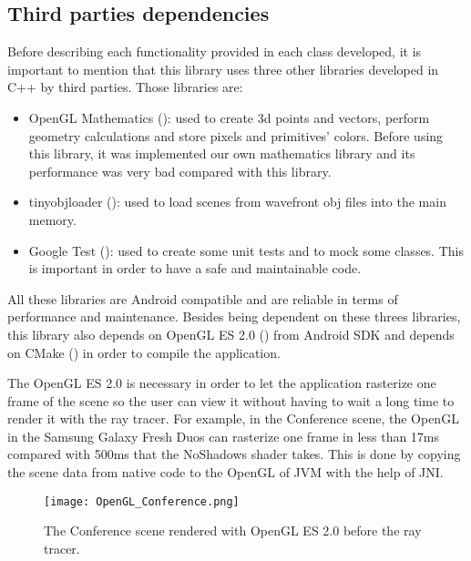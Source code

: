 \subsection{Third parties dependencies}

\par
Before describing each functionality provided in each class developed, it is important to mention that this library uses three other libraries developed in C++ by third parties.
Those libraries are:

\begin{itemize}
	\item OpenGL Mathematics (\cite{GLM}): used to create 3d points and vectors, perform geometry calculations and store pixels and primitives' colors.
	Before using this library, it was implemented our own mathematics library and its performance was very bad compared with this library.
	\item tinyobjloader (\cite{tinyobjloader}): used to load scenes from wavefront obj files into the main memory.
	\item Google Test (\cite{GoogleTest}): used to create some unit tests and to mock some classes.
	This is important in order to have a safe and maintainable code.
\end{itemize}

\par
All these libraries are Android compatible and are reliable in terms of performance and maintenance.
Besides being dependent on these threes libraries, this library also depends on OpenGL ES 2.0 (\cite{OpenGL_ES_2}) from Android SDK and depends on CMake (\cite{CMake}) in order to compile the application.

\par
The OpenGL ES 2.0 is necessary in order to let the application rasterize one frame of the scene so the user can view it without having to wait a long time to render it with the ray tracer.
For example, in the Conference scene, the OpenGL in the Samsung Galaxy Fresh Duos can rasterize one frame in less than 17ms compared with 500ms that the NoShadows shader takes.
This is done by copying the scene data from native code to the OpenGL of JVM with the help of JNI.

\begin{figure}[H]
	\centering
	\caption{The Conference scene rendered with OpenGL ES 2.0 before the ray tracer.}
	\label{The Conference scene rendered with OpenGL ES 2.0 before the ray tracer.}
	\texttt{[image: OpenGL\_Conference.png]}
\end{figure}

